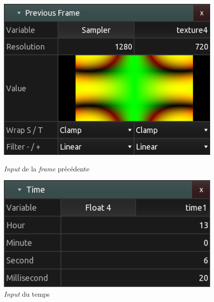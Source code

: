 \begin{figure}[h]
  \begin{minipage}[b]{0.45\linewidth}
    \centering
    \includegraphics[width=\linewidth]{images/experiments/kodelife00.png}
    \caption{\textit{Input} de la \textit{frame} précédente}
    \label{kodelife00}
  \end{minipage}
  \hspace{0.1\linewidth} %
  \begin{minipage}[b]{0.45\linewidth}
    \centering
    \includegraphics[width=\linewidth]{images/experiments/kodelife01.png}
    \caption{\textit{Input} du temps}
    \label{kodelife01}
  \end{minipage}
\end{figure}

